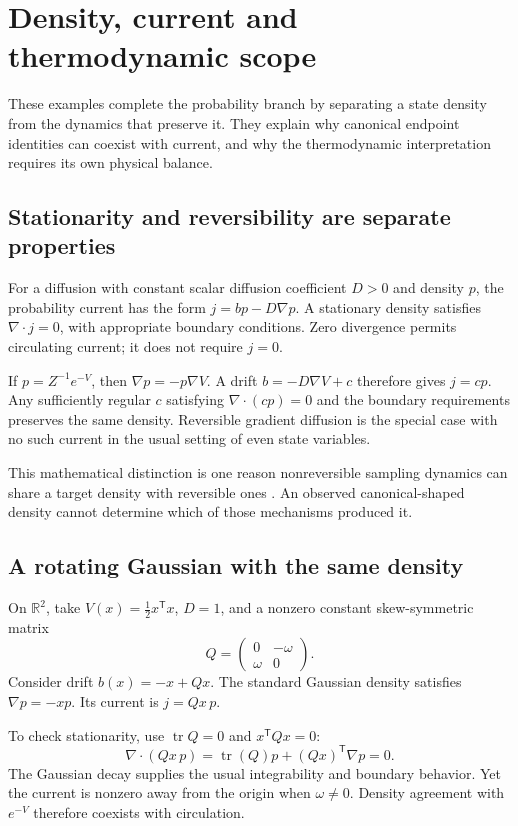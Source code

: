 \chapter{Density, current and thermodynamic scope}\label{app:probability}

These examples complete the probability branch by separating a state density from the dynamics that preserve it. They explain why canonical endpoint identities can coexist with current, and why the thermodynamic interpretation requires its own physical balance.


\section{Stationarity and reversibility are separate properties}
For a diffusion with constant scalar diffusion coefficient $D>0$ and density $p$, the probability current has the form $j=bp-D\nabla p$. A stationary density satisfies $\nabla\cdot j=0$, with appropriate boundary conditions. Zero divergence permits circulating current; it does not require $j=0$.

If $p=Z^{-1}e^{-V}$, then $\nabla p=-p\nabla V$. A drift $b=-D\nabla V+c$ therefore gives $j=cp$. Any sufficiently regular $c$ satisfying $\nabla\cdot(cp)=0$ and the boundary requirements preserves the same density. Reversible gradient diffusion is the special case with no such current in the usual setting of even state variables.

This mathematical distinction is one reason nonreversible sampling dynamics can share a target density with reversible ones \cite{duncan}. An observed canonical-shaped density cannot determine which of those mechanisms produced it.

\section{A rotating Gaussian with the same density}
On $\mathbb R^2$, take $V(x)=\tfrac12x^{\mathsf T}x$, $D=1$, and a nonzero constant skew-symmetric matrix
\begin{equation}
 Q=\begin{pmatrix}0&-\omega\\\omega&0\end{pmatrix}.
\end{equation}
Consider drift $b(x)=-x+Qx$. The standard Gaussian density satisfies $\nabla p=-xp$. Its current is $j=Qx\,p$.

To check stationarity, use $\operatorname{tr}Q=0$ and $x^{\mathsf T}Qx=0$:
\begin{equation}
 \nabla\cdot(Qx\,p)=\operatorname{tr}(Q)p+(Qx)^{\mathsf T}\nabla p=0.
\end{equation}
The Gaussian decay supplies the usual integrability and boundary behavior. Yet the current is nonzero away from the origin when $\omega\ne0$. Density agreement with $e^{-V}$ therefore coexists with circulation.

